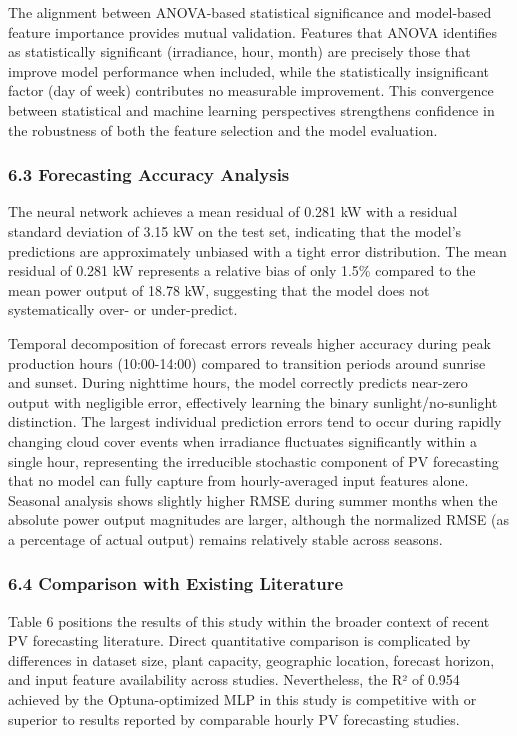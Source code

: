 \documentclass[
  11pt,
]{article}
\begin{document}
The alignment between ANOVA-based statistical significance and
model-based feature importance provides mutual validation. Features that
ANOVA identifies as statistically significant (irradiance, hour, month)
are precisely those that improve model performance when included, while
the statistically insignificant factor (day of week) contributes no
measurable improvement. This convergence between statistical and machine
learning perspectives strengthens confidence in the robustness of both
the feature selection and the model evaluation.

\subsubsection{6.3 Forecasting Accuracy
Analysis}\label{forecasting-accuracy-analysis}

The neural network achieves a mean residual of 0.281 kW with a residual
standard deviation of 3.15 kW on the test set, indicating that the
model’s predictions are approximately unbiased with a tight error
distribution. The mean residual of 0.281 kW represents a relative bias
of only 1.5\% compared to the mean power output of 18.78 kW, suggesting
that the model does not systematically over- or under-predict.

Temporal decomposition of forecast errors reveals higher accuracy during
peak production hours (10:00-14:00) compared to transition periods
around sunrise and sunset. During nighttime hours, the model correctly
predicts near-zero output with negligible error, effectively learning
the binary sunlight/no-sunlight distinction. The largest individual
prediction errors tend to occur during rapidly changing cloud cover
events when irradiance fluctuates significantly within a single hour,
representing the irreducible stochastic component of PV forecasting that
no model can fully capture from hourly-averaged input features alone.
Seasonal analysis shows slightly higher RMSE during summer months when
the absolute power output magnitudes are larger, although the normalized
RMSE (as a percentage of actual output) remains relatively stable across
seasons.

\subsubsection{6.4 Comparison with Existing
Literature}\label{comparison-with-existing-literature}

Table 6 positions the results of this study within the broader context
of recent PV forecasting literature. Direct quantitative comparison is
complicated by differences in dataset size, plant capacity, geographic
location, forecast horizon, and input feature availability across
studies. Nevertheless, the R² of 0.954 achieved by the Optuna-optimized
MLP in this study is competitive with or superior to results reported by
comparable hourly PV forecasting studies.
\end{document}
